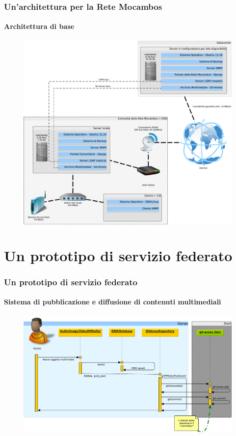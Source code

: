 \documentclass{beamer}
\begin{document}
\begin{frame}
  \frametitle{Un'architettura per la Rete Mocambos}
  \framesubtitle{Architettura di base}
	\begin{figure}
		\includegraphics[height=0.7\textheight]{./Figure/SchemaServer_ReteMocambos-crop.pdf}
	\end{figure}
\end{frame}

\section{Un prototipo di servizio federato}

\begin{frame}
  \frametitle{Un prototipo di servizio federato}
  \framesubtitle{Sistema di pubblicazione e diffusione di contenuti multimediali}
	\begin{figure}
		\includegraphics[width=\textwidth]{./Figure/SequenceDiagram_NuovoOggetto-crop.pdf}
	\end{figure}
\end{frame}
\end{document}
